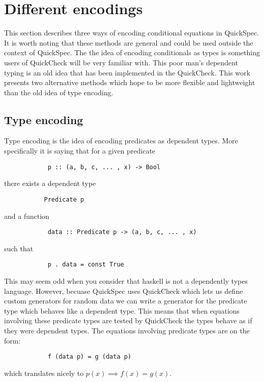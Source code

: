 \section{Different encodings}\label{encodings}

    This section describes three
    ways of encoding conditional
    equations in QuickSpec. It is
    worth noting that these methods
    are general and could be used outside
    the context of QuickSpec. The
    the idea of encoding conditionals
    as types is something users of
    QuickCheck %
    will be very familiar with. This poor
    man's dependent typing is an old idea that has
    been implemented in the QuickCheck.%
    This work presents two alternative methods
    which hope to be more flexible and lightweight
    than the old idea of type encoding.

    \subsection{Type encoding}

        Type encoding is the idea of encoding
        predicates as dependent types. More specifically
        it is saying that for a given predicate
        \begin{verbatim}
            p :: (a, b, c, ... , x) -> Bool
        \end{verbatim}
        there exists a dependent type
        \begin{verbatim}
           Predicate p
        \end{verbatim}
        and a function 
        \begin{verbatim}
            data :: Predicate p -> (a, b, c, ... , x)
        \end{verbatim}
        such that 
        \begin{verbatim}
            p . data = const True
        \end{verbatim}
        This may seem odd when you consider that haskell is not a dependently types
        language. However, becuase QuickSpec uses QuickCheck which lets us define
        custom generators for random data we can write a generator for 
        the predicate type which behaves like a dependent type.
        This means that when equations involving these predicate
        types are tested by QuickCheck the types behave as if they were dependent types.
        The equations involving predicate types are on the form:
        \begin{verbatim}
            f (data p) = g (data p)
        \end{verbatim}
        which translates nicely to $p(x) \implies f(x) = g(x)$.

